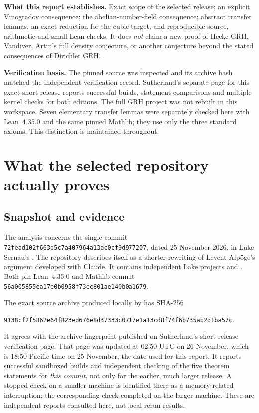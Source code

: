 \documentclass[11pt,letterpaper]{article}
\theoremstyle{definition}\newtheorem{definition}[theorem]{Definition}
\theoremstyle{remark}\newtheorem{remark}[theorem]{Remark}
\newcommand{\sha}{72fead102f663d5c7a407964a13dc0cf9d977207}
\newcommand{\keybox}[1]{\par\smallskip\noindent\colorbox{pale}{\parbox{\dimexpr\linewidth-2\fboxsep}{#1}}\par\smallskip}
\begin{document}
\keybox{\textbf{What this report establishes.} Exact scope of the selected release; an explicit
Vinogradov consequence; the abelian-number-field consequence; abstract transfer lemmas;
an exact reduction for the cubic target; and reproducible source, arithmetic and small Lean checks.
It does \emph{not} claim a new proof of Hecke GRH, Vandiver, Artin's full density conjecture,
or another conjecture beyond the stated consequences of Dirichlet GRH.}

\textbf{Verification basis.} The pinned source was inspected and its archive hash matched the
independent verification record. Sutherland's separate page for this exact short release reports
successful builds, statement comparisons and multiple kernel checks for both editions.
The full GRH project was not rebuilt in this workspace. Seven elementary transfer lemmas were
separately checked here with Lean~4.35.0 and the same pinned Mathlib; they use only the three
standard axioms. This distinction is maintained throughout.\cite{repo,shortchecks}

\clearpage
{\small\setlength{\parskip}{0pt}\tableofcontents}
\clearpage

\section{What the selected repository actually proves}
\subsection{Snapshot and evidence}
The analysis concerns the single commit \texttt{\sha}, dated 25 November 2026,
in Luke Sernau's . The repository describes itself as a shorter rewriting
of Levent Alp\"oge's argument developed with Claude. It contains independent Lake projects
 and . Both pin Lean~4.35.0 and Mathlib commit
\texttt{56a005855ea17e0b0958f73ec801ae140b0a1679}.\cite{repo,readme}

The exact source archive produced locally by  has SHA-256
\begin{center}\footnotesize\texttt{9138cf2f5862e64f823ed676e8d37333c0717e1a13cd8f74f6b735ab2d1ba57c}.
\end{center}
It agrees with the archive fingerprint published on Sutherland's short-release verification page.
That page was updated at 02:50 UTC on 26 November, which is 18:50 Pacific time on
25 November, the date used for this report. It reports successful sandboxed builds and
independent checking of the five theorem statements for \emph{this commit}, not only for the
earlier, much larger release. A stopped check on a smaller machine is identified there as a
memory-related interruption; the corresponding check completed on the larger machine.
These are independent reports consulted here, not local rerun results.\cite{shortchecks}
\end{document}

